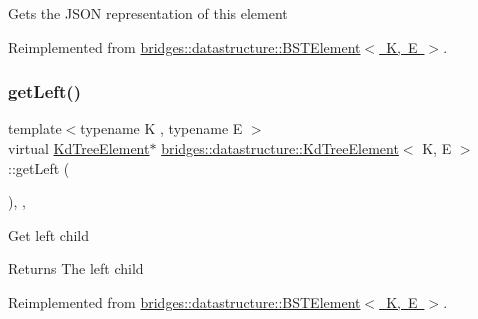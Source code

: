 Gets the J\+S\+ON representation of this element 

Reimplemented from \mbox{\hyperlink{classbridges_1_1datastructure_1_1_b_s_t_element_a8f962a01b6e0eff59abeee7768264fd9}{bridges\+::datastructure\+::\+B\+S\+T\+Element$<$ K, E $>$}}.

\mbox{\label{classbridges_1_1datastructure_1_1_kd_tree_element_a875bfa2dfd88a7740f7bcd28a117c12a}} 
\subsubsection{\texorpdfstring{get\+Left()}{getLeft()}\hspace{0.1cm}{\footnotesize\ttfamily [1/2]}}
{\footnotesize\ttfamily template$<$typename K , typename E $>$ \\
virtual \mbox{\hyperlink{classbridges_1_1datastructure_1_1_kd_tree_element}{Kd\+Tree\+Element}}$\ast$ \mbox{\hyperlink{classbridges_1_1datastructure_1_1_kd_tree_element}{bridges\+::datastructure\+::\+Kd\+Tree\+Element}}$<$ K, E $>$\+::get\+Left (\begin{DoxyParamCaption}{ }\end{DoxyParamCaption})\hspace{0.3cm}{\ttfamily [inline]}, {\ttfamily [override]}, {\ttfamily [virtual]}}

Get left child \begin{DoxyReturn}{Returns}
The left child 
\end{DoxyReturn}


Reimplemented from \mbox{\hyperlink{classbridges_1_1datastructure_1_1_b_s_t_element_af863c624691c11db26ae3b6d723d1f5c}{bridges\+::datastructure\+::\+B\+S\+T\+Element$<$ K, E $>$}}.

\mbox{\label{classbridges_1_1datastructure_1_1_kd_tree_element_a653597918fbc6e31b84fcf8dbdf67122}} 
